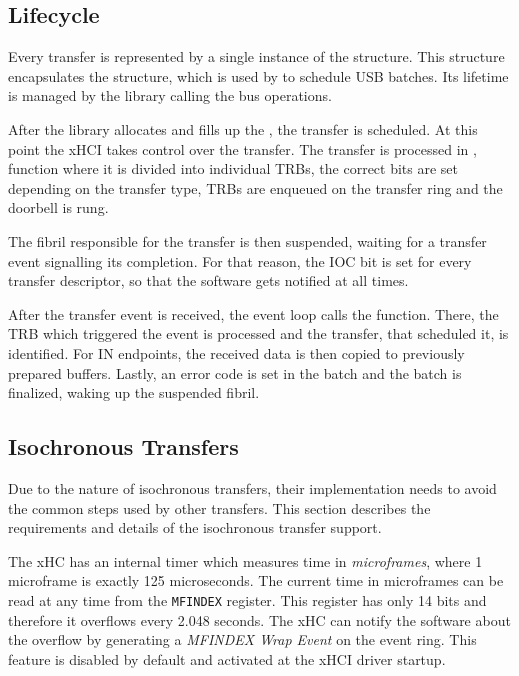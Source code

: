 \subsection{Lifecycle}

Every transfer is represented by a single instance of the 
structure. This structure encapsulates the 
structure, which is used by  to schedule USB batches. Its
lifetime is managed by the library calling the bus operations.

After the library allocates and fills up the , the
transfer is scheduled. At this point the xHCI takes control over the transfer.
The transfer is processed in , function where it is divided into individual
TRBs, the correct bits are set depending on the transfer type, TRBs are
enqueued on the transfer ring and the doorbell is rung.

The fibril responsible for the transfer is then suspended, waiting for a transfer event
signalling its completion. For that reason, the IOC bit is set
for every transfer descriptor, so that the software gets notified at all times.

After the transfer event is received, the event loop calls the
 function. There, the TRB which triggered the event is
processed and the transfer, that scheduled it, is identified. For IN endpoints, the
received data is then copied to previously prepared buffers. Lastly, an error code is set in
the batch and the batch is finalized, waking up the suspended fibril.

\subsection{Isochronous Transfers}

Due to the nature of isochronous transfers, their implementation needs to avoid
the common steps used by other transfers. This section describes the
requirements and details of the isochronous transfer support.

The xHC has an internal timer which measures time in \textit{microframes},
where 1 microframe is exactly 125 microseconds. The current time in microframes
can be read at any time from the \texttt{MFINDEX} register. This register has only
14 bits and therefore it overflows every 2.048 seconds. The xHC can notify the
software about the overflow by generating a \textit{MFINDEX Wrap Event} on the
event ring. This feature is disabled by default and activated at the xHCI driver startup.

